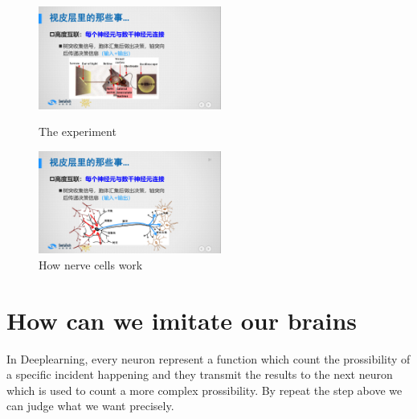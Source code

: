 \documentclass{article}
\begin{document}
\begin{figure}[htbp]

\begin{minipage}[t]{0.45\linewidth}
\centering
\includegraphics[width=6cm]{experiment.png}
\caption{The experiment}
\label{experiment}
\end{minipage}
\hfill
\begin{minipage}[t]{0.45\linewidth}
\centering
\includegraphics[width=6cm]{nerve_cells.png}
\caption{How nerve cells work}
\label{nervecells}
\end{minipage}

\end{figure}

\section{How can we imitate our brains}
In Deeplearning, every neuron represent a function which count the prossibility of a specific incident happening and they transmit the results to the next neuron which is used to count a more complex prossibility. By repeat the step above we can judge what we want precisely.
\end{document}

